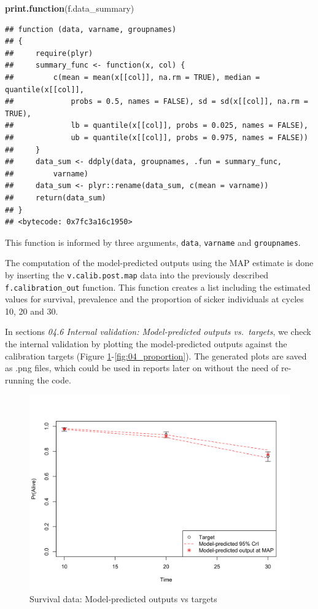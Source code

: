 \documentclass[]{article}
\newenvironment{Shaded}{\begin{snugshade}}{\end{snugshade}}
\newcommand{\KeywordTok}[1]{\textcolor[rgb]{0.13,0.29,0.53}{\textbf{#1}}}
\newcommand{\NormalTok}[1]{#1}
\begin{document}
\begin{Shaded}
\begin{Highlighting}[]
\KeywordTok{print.function}\NormalTok{(f.data_summary)}
\end{Highlighting}
\end{Shaded}

\begin{verbatim}
## function (data, varname, groupnames) 
## {
##     require(plyr)
##     summary_func <- function(x, col) {
##         c(mean = mean(x[[col]], na.rm = TRUE), median = quantile(x[[col]], 
##             probs = 0.5, names = FALSE), sd = sd(x[[col]], na.rm = TRUE), 
##             lb = quantile(x[[col]], probs = 0.025, names = FALSE), 
##             ub = quantile(x[[col]], probs = 0.975, names = FALSE))
##     }
##     data_sum <- ddply(data, groupnames, .fun = summary_func, 
##         varname)
##     data_sum <- plyr::rename(data_sum, c(mean = varname))
##     return(data_sum)
## }
## <bytecode: 0x7fc3a16c1950>
\end{verbatim}

This function is informed by three arguments, \texttt{data},
\texttt{varname} and \texttt{groupnames}.

The computation of the model-predicted outputs using the MAP estimate is
done by inserting the \texttt{v.calib.post.map} data into the previously
described \texttt{f.calibration\_out} function. This function creates a
list including the estimated values for survival, prevalence and the
proportion of sicker individuals at cycles 10, 20 and 30.

In sections \emph{04.6 Internal validation: Model-predicted outputs
vs.~targets}, we check the internal validation by plotting the
model-predicted outputs against the calibration targets (Figure
\ref{fig:04_surv}-\ref{fig:04_proportion}). The generated plots are
saved as .png files, which could be used in reports later on without the
need of re-running the code.

\begin{figure}
\centering
\includegraphics{../figs/04_posterior-vs-targets-survival.png}
\caption{Survival data: Model-predicted outputs vs targets
\label{fig:04_surv}}
\end{figure}
\end{document}
